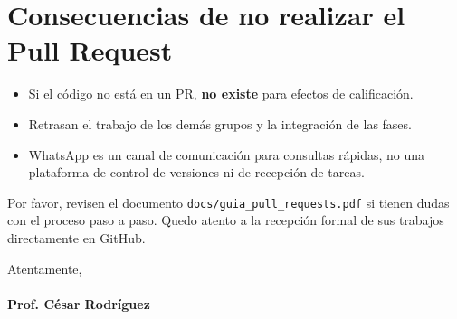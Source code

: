 \documentclass[12pt,a4paper]{article}
\begin{document}
\section*{Consecuencias de no realizar el Pull Request}

\begin{itemize}[label=$\bullet$]
    \item Si el código no está en un PR, \textbf{no existe} para efectos de calificación.
    \item Retrasan el trabajo de los demás grupos y la integración de las fases.
    \item WhatsApp es un canal de comunicación para consultas rápidas, no una plataforma de control de versiones ni de recepción de tareas.
\end{itemize}

Por favor, revisen el documento \texttt{docs/guia\_pull\_requests.pdf} si tienen dudas con el proceso paso a paso. Quedo atento a la recepción formal de sus trabajos directamente en GitHub.

\vspace{1cm}
\noindent Atentamente, \\
\vspace{0.5cm} \\
\textbf{Prof. César Rodríguez}
\end{document}
